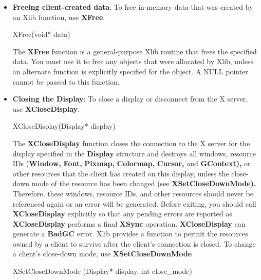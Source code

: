 \documentclass{report}
\begin{document}
\begin{itemize}
\begin{cppcode}
                XNoOp(display)
            \end{cppcode}
            \bigbreak \noindent 
            The \textbf{XNoOp} function sends a \textbf{NoOperation} protocol request to the X server, thereby exercising the connection.
        \item \textbf{Freeing client-created data}: To free in-memory data that was created by an Xlib function, use \textbf{XFree}.
            \bigbreak \noindent 
            \begin{cppcode}
            XFree(void* data)
            \end{cppcode}
            \bigbreak \noindent 
            The \textbf{XFree} function is a general-purpose Xlib routine that frees the specified data. You must use it to free any objects that were allocated by Xlib, unless an alternate function is explicitly specified for the object. A NULL pointer cannot be passed to this function.
        \item \textbf{Closing the Display}: To close a display or disconnect from the X server, use \textbf{XCloseDisplay}.
            \bigbreak \noindent 
            \begin{cppcode}
            XCloseDisplay(Display* display)
            \end{cppcode}
            \bigbreak \noindent 
            The \textbf{XCloseDisplay} function closes the connection to the X server for the display specified in the \textbf{Display} structure and destroys all windows, resource IDs (\textbf{Window,} \textbf{Font,} \textbf{Pixmap,} \textbf{Colormap,} \textbf{Cursor,} and \textbf{GContext),} or other resources that the client has created on this display, unless the close-down mode of the resource has been changed (see \textbf{XSetCloseDownMode).} Therefore, these windows, resource IDs, and other resources should never be referenced again or an error will be generated. Before exiting, you should call \textbf{XCloseDisplay} explicitly so that any pending errors are reported as \textbf{XCloseDisplay} performs a final \textbf{XSync} operation.
            \bigbreak \noindent 
            \textbf{XCloseDisplay} can generate a \textbf{BadGC} error.
            \bigbreak \noindent 
            Xlib provides a function to permit the resources owned by a client to survive after the client’s connection is closed. To change a client’s close-down mode, use \textbf{XSetCloseDownMode}
            \bigbreak \noindent 
            \begin{cppcode}
                XSetCloseDownMode (Display* display, int close_mode)

\end{cppcode}
\end{itemize}
\end{document}
